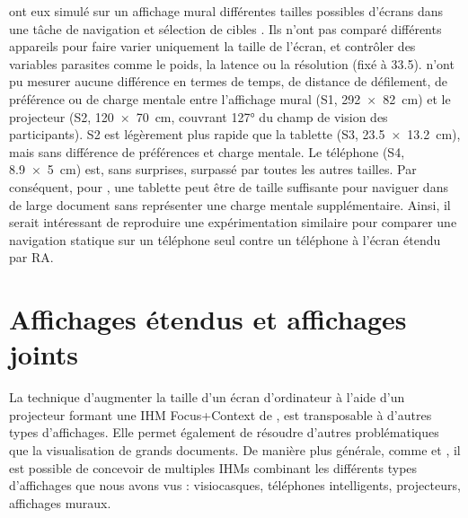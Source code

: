 
\cite{Raedle2014} ont eux simulé sur un affichage mural différentes tailles possibles d'écrans  dans une tâche de navigation et sélection de cibles . Ils n'ont pas comparé différents appareils pour faire varier uniquement la taille de l'écran, et contrôler des variables parasites comme le poids, la latence ou la résolution (fixé à \SI{33.5}{\ppi}). \citeauthor{Raedle2014} n'ont pu mesurer aucune différence en termes de temps, de distance de défilement, de préférence ou de charge mentale entre l'affichage mural (S1, \SI{292x82}{\cm}) et le projecteur (S2, \SI{120x70}{\cm}, couvrant \ang{127} du champ de vision des participants). S2 est légèrement plus rapide que la tablette (S3, \SI{23.5x13.2}{\cm}), mais sans différence de préférences et charge mentale. Le téléphone (S4, \SI{8.9x5}{\cm}) est, sans surprises, surpassé par toutes les autres tailles. Par conséquent, pour \citeauthor{Raedle2014}, une tablette peut être de taille suffisante pour naviguer dans de large document sans représenter une charge mentale supplémentaire. Ainsi, il serait intéressant de reproduire une expérimentation similaire pour comparer une navigation statique sur un téléphone seul contre un téléphone à l'écran étendu par RA.


\section{Affichages étendus et affichages joints}
\label{subsec:litterature_extended_screens}

La technique d'augmenter la taille d'un écran d'ordinateur à l'aide d'un projecteur formant une IHM Focus+Context de \cite{Baudisch2002}, est transposable à d'autres types d'affichages. Elle permet également de résoudre d'autres problématiques que la visualisation de grands documents. De manière plus générale, comme \cite{Grubert2015} et \cite{Serrano2015}, il est possible de concevoir de multiples IHMs combinant les différents types d'affichages que nous avons vus : visiocasques, téléphones intelligents, projecteurs, affichages muraux.

